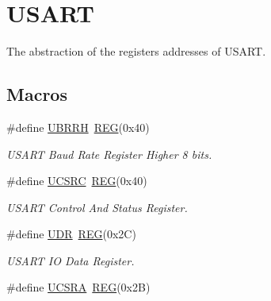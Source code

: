 \hypertarget{group__USARTMCAL}{\section{U\+S\+A\+R\+T}
\label{group__USARTMCAL}
}


The abstraction of the registers addresses of U\+S\+A\+R\+T.  


\subsection*{Macros}
\begin{DoxyCompactItemize}
\item 
\hypertarget{group__USARTMCAL_ga2167239f6998b9392e1fd1d924cc74b1}{\#define \hyperlink{group__USARTMCAL_ga2167239f6998b9392e1fd1d924cc74b1}{U\+B\+R\+R\+H}~\hyperlink{group__MCAL_ga72e45020e46f285689db51c46f273403}{R\+E\+G}(0x40)}\label{group__USARTMCAL_ga2167239f6998b9392e1fd1d924cc74b1}

\begin{DoxyCompactList}\small\item\em U\+S\+A\+R\+T Baud Rate Register Higher 8 bits. \end{DoxyCompactList}\item 
\hypertarget{group__USARTMCAL_ga649318acb8872aa202350cbe279452a4}{\#define \hyperlink{group__USARTMCAL_ga649318acb8872aa202350cbe279452a4}{U\+C\+S\+R\+C}~\hyperlink{group__MCAL_ga72e45020e46f285689db51c46f273403}{R\+E\+G}(0x40)}\label{group__USARTMCAL_ga649318acb8872aa202350cbe279452a4}

\begin{DoxyCompactList}\small\item\em U\+S\+A\+R\+T Control And Status Register. \end{DoxyCompactList}\item 
\hypertarget{group__USARTMCAL_gac54c0178d860edd97197fe90ab06f067}{\#define \hyperlink{group__USARTMCAL_gac54c0178d860edd97197fe90ab06f067}{U\+D\+R}~\hyperlink{group__MCAL_ga72e45020e46f285689db51c46f273403}{R\+E\+G}(0x2\+C)}\label{group__USARTMCAL_gac54c0178d860edd97197fe90ab06f067}

\begin{DoxyCompactList}\small\item\em U\+S\+A\+R\+T I\+O Data Register. \end{DoxyCompactList}\item 
\hypertarget{group__USARTMCAL_ga152a205b3e27513efb3282daac08201b}{\#define \hyperlink{group__USARTMCAL_ga152a205b3e27513efb3282daac08201b}{U\+C\+S\+R\+A}~\hyperlink{group__MCAL_ga72e45020e46f285689db51c46f273403}{R\+E\+G}(0x2\+B)}\label{group__USARTMCAL_ga152a205b3e27513efb3282daac08201b}


\end{DoxyCompactItemize}
